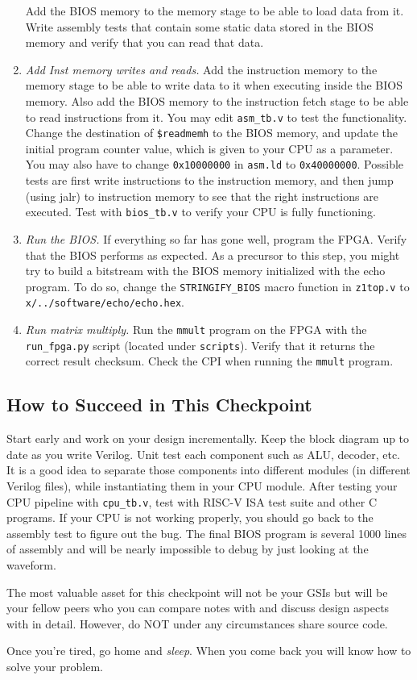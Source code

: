 \begin{enumerate}
  Add the BIOS memory to the memory stage to be able to load data from it.
  Write assembly tests that contain some static data stored in the BIOS memory
  and verify that you can read that data.
\item \textit{Add Inst memory writes and reads.}
  Add the instruction memory to the memory stage to be able to write data to it when executing inside the BIOS memory.
  Also add the BIOS memory to the instruction fetch stage to be able to read instructions from it.
  You may edit \verb|asm_tb.v| to test the functionality.
  Change the destination of \verb|$readmemh| to the BIOS memory,
  and update the initial program counter value, which is given to your CPU as a parameter.
  You may also have to change \verb|0x10000000| in \verb|asm.ld| to \verb|0x40000000|.
  Possible tests are first write instructions to the instruction memory,
  and then jump (using jalr) to instruction memory to see that the right instructions are executed.
  Test with \verb|bios_tb.v| to verify your CPU is fully functioning.
\item \textit{Run the BIOS.}
  If everything so far has gone well, program the FPGA.
  Verify that the BIOS performs as expected.
  As a precursor to this step, you might try to build a bitstream with the BIOS memory initialized with the echo program.
  To do so, change the \verb|STRINGIFY_BIOS| macro function in \verb|z1top.v| to \verb|x/../software/echo/echo.hex|.
\item \textit{Run matrix multiply.}
  Run the \verb|mmult| program on the FPGA with the \verb|run_fpga.py| script (located under \texttt{scripts}).
  Verify that it returns the correct result checksum.
  Check the CPI when running the \verb|mmult| program.
\end{enumerate}


\subsection{How to Succeed in This Checkpoint}
Start early and work on your design incrementally.
Keep the block diagram up to date as you write Verilog.
Unit test each component such as ALU, decoder, etc.
It is a good idea to separate those components into different modules (in different Verilog files), while instantiating them in your CPU module.
After testing your CPU pipeline with \verb|cpu_tb.v|, test with RISC-V ISA test suite and other C programs.
If your CPU is not working properly, you should go back to the assembly test to figure out the bug.
The final BIOS program is several 1000 lines of assembly and will be nearly impossible to debug by just looking at the waveform.

The most valuable asset for this checkpoint will not be your GSIs but will be your fellow peers who you can compare notes with and discuss design aspects with in detail.
However, do NOT under any circumstances share source code.

Once you're tired, go home and \textit{sleep}. When you come back you will know how to solve your problem.

\newpage
